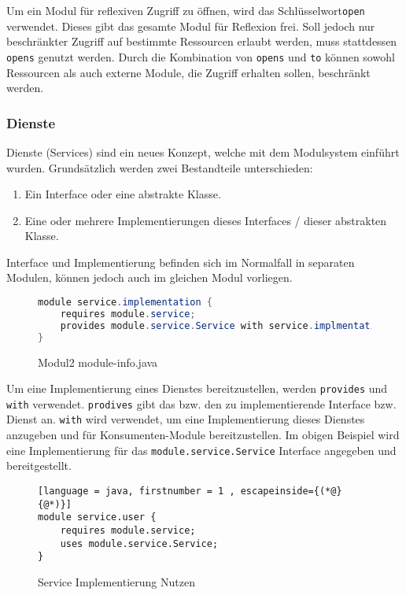 Um ein Modul für reflexiven Zugriff zu öffnen, wird das Schlüsselwort\texttt{open} verwendet.
Dieses gibt das gesamte Modul für Reflexion frei.
Soll jedoch nur beschränkter Zugriff auf bestimmte Ressourcen erlaubt werden, muss stattdessen \texttt{opens} genutzt werden.
Durch die Kombination von \texttt{opens} und \texttt{to} können sowohl Ressourcen als auch externe Module, die Zugriff erhalten sollen, beschränkt werden.


\subsubsection{Dienste}
Dienste (Services) sind ein neues Konzept, welche mit dem Modulsystem einführt wurden.
Grundsätzlich werden zwei Bestandteile unterschieden:

\begin{enumerate}[noitemsep]
	\item Ein Interface oder eine abstrakte Klasse.
	\item Eine oder mehrere Implementierungen dieses Interfaces / dieser abstrakten Klasse. 
\end{enumerate}

Interface und Implementierung befinden sich im Normalfall in separaten Modulen, können jedoch auch im gleichen Modul vorliegen.


\begin{figure}[hbt!]
\begin{lstlisting}[language = java, firstnumber = 1 ,]
module service.implementation {
	requires module.service;
	provides module.service.Service with service.implmentation.MyImplementation;
}
\end{lstlisting}
\caption{Modul2 module-info.java}
\label{fig:module2-info}
\end{figure}


Um eine Implementierung eines Dienstes bereitzustellen, werden \texttt{provides} und \texttt{with} verwendet.
\texttt{prodives} gibt das bzw. den zu implementierende Interface bzw. Dienst an. 
\texttt{with} wird verwendet, um eine Implementierung dieses Dienstes anzugeben und für Konsumenten-Module bereitzustellen. 
Im obigen Beispiel wird eine Implementierung für das \texttt{module.service.Service} Interface angegeben und bereitgestellt.


\begin{figure}[hbt!]
\begin{lstlisting}[language = java, firstnumber = 1 , escapeinside={(*@}{@*)}]
module service.user {
	requires module.service;
	uses module.service.Service;
}
\end{lstlisting}
\caption{Service Implementierung Nutzen}
\label{fig:service-use}
\end{figure}


